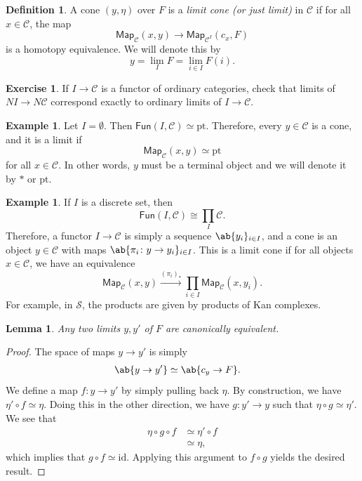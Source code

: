 \documentclass[10pt, oneside]{memoir}
\newtheorem{lem}[thm]{Lemma}
\theoremstyle{definition}
\newtheorem{defn}[thm]{Definition}
\newtheorem{exm}[thm]{Example}
\newtheorem{exer}[thm]{Exercise}
\theoremstyle{remark}
\theoremstyle{plain}
\theoremstyle{definition}
\theoremstyle{remark}
\newcommand{\mc}[1]{\mathcal{#1}}
\newcommand{\mr}[1]{\mathrm{#1}}
\newcommand{\ms}[1]{\mathsf{#1}}
\newcommand{\1}{\mathbf{1}}
\newcommand{\2}{\mathbf{2}}
\newcommand{\3}{\mathbf{3}}
\begin{document}
\begin{defn}
    A cone \((y, \eta) \) over \(F \) is a \textit{limit cone (or just limit)} in \(\mc{C} \) if for all \(x \in \mc{C} \), the map
    \[ \ms{Map}_{\mc{C}}(x,y) \to \ms{Map}_{\mc{C}^I}(c_x, F) \]
    is a homotopy equivalence. We will denote this by
    \[ y = \lim_I F = \lim_{i \in I} F(i). \]
\end{defn}

\begin{exer}
    If \(I \to \mc{C} \) is a functor of ordinary categories, check that limits of \(NI \to N \mc{C} \) correspond exactly to ordinary limits of \(I \to \mc{C} \).
\end{exer}

\begin{exm}
    Let \(I = \emptyset \). Then \(\ms{Fun}(I, \mc{C}) \simeq \mr{pt} \). Therefore, every \(y \in \mc{C} \) is a cone, and it is a limit if
    \[ \ms{Map}_{\mc{C}}(x,y) \simeq \mr{pt} \]
    for all \(x \in \mc{C} \). In other words, \(y \) must be a terminal object and we will denote it by \(* \) or \(\mr{pt} \).
\end{exm}

\begin{exm}
    If \(I \) is a discrete set, then 
    \[ \ms{Fun}(I, \mc{C}) \cong \prod_I \mc{C}. \]
    Therefore, a functor \(I \to \mc{C} \) is simply a sequence \(\ab\{y_i\}_{i \in I} \), and a cone is an object \(y \in \mc{C} \) with maps \(\ab\{\pi_i \colon y \to y_i \}_{i \in I} \). This is a limit cone if for all objects \(x \in \mc{C} \), we have an equivalence
    \[ \ms{Map}_{\mc{C}}(x,y) \xrightarrow{(\pi_i)_*} \prod_{i \in I} \ms{Map}_{\mc{C}}(x, y_i). \]
    For example, in \(\mc{S} \), the products are given by products of Kan complexes.
\end{exm}

\begin{lem}
    Any two limits \(y, y' \) of \(F \) are canonically equivalent.
\end{lem}

\begin{proof}
    The space of maps \(y \to y' \) is simply
    \begin{align*}
        \ab\{ y\to y' \} &\simeq \ab\{c_y \to F \}.
    \end{align*}
    We define a map \(f \colon y \to y' \) by simply pulling back \(\eta \). By construction, we have \(\eta' \circ f \simeq \eta \). Doing this in the other direction, we have \(g \colon y' \to y \) such that \(\eta \circ g \simeq \eta' \). We see that 
    \begin{align*}
        \eta \circ g \circ f &\simeq \eta' \circ f \\
        &\simeq \eta,
    \end{align*}
    which implies that \(g \circ f \simeq \mr{id} \). Applying this argument to \(f \circ g \) yields the desired result.
\end{proof}
\end{document}
